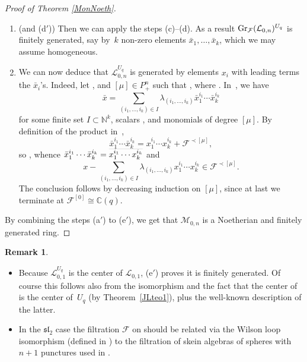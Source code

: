 \documentclass[10pt,a4paper]{amsart}
\numberwithin{equation}{section}
\theoremstyle{definition}
\newtheorem{Remark}[teo]{Remark}
\newcommand{\mc}{\mathbb{C}}
\newcommand{\mn}{\mathbb{N}}
\newcommand{\Ll}{{\mathcal L}}
\newcommand{\Mm}{{\mathcal M}}
\begin{document}
\begin{proof}[Proof of Theorem \ref{MonNoeth}]
\begin{enumerate}
\item[(c$'$)] (and (d$'$)) Then we can apply the steps (c)--(d). As a result ${\rm Gr}_{{\mathcal F}}({\mathcal L}_{0,n})^{U_q}$ is finitely generated, say by~$k$ non-zero elements $\bar{x}_1,\dots,\bar{x}_k$, which we may assume homogeneous.
\item[(e$'$)] We can now deduce that $\Ll_{0,n}^{U_q}$ is generated by elements $x_i$ with leading terms the
$\bar{x}_i$'s. Indeed, let \smash{$x\in \Ll_{0,n}^{U_q}$}, and $[\mu]\in P_+^n$ such that , where . In~, we have
\[
 \bar{x}\! =\! \sum_{(i_1,\dots ,i_k)\in I} \lambda_{(i_1,\dots ,i_k)} \bar{x}_1^{i_1}\cdots\bar{x}_k^{i_k}
 \]
 for some finite set ${I\!\subset\! \mn^k}$, scalars \smash{$\lambda_{(i_1,\dots ,i_k)}\in \mc(q)$}, and monomials  of degree $[\mu]$. By definition of the product in~, \[
 \bar{x}_1^{i_1}\cdots\bar{x}_k^{i_k} = x_1^{i_1}\cdots x_k^{i_k} + {\mathcal F}^{\prec[\mu]},
 \]
 so , whence $\smash{\bar{x}_1^{i_1}\cdots\bar{x}_k^{i_k}} = \smash{\overline{x_1^{i_1}\cdots x_k^{i_k}}}$ and
 \[
 x- \sum_{(i_1,\dots ,i_k)\in I} \lambda_{(i_1,\dots ,i_k)} x_1^{i_1}\cdots x_k^{i_k} \in {\mathcal F}^{\prec [\mu]}.
 \]
 The conclusion follows by decreasing induction on $[\mu]$, since at last we terminate at ${{\mathcal F}^{[0]}\cong \mc(q)}$.
\end{enumerate}

By combining the steps (a$'$) to (e$'$), we get that $\Mm_{0,n}$ is a Noetherian and finitely generated ring.
\end{proof}

\begin{Remark} \quad
\begin{itemize}\itemsep=0pt
\item[(1)] Because ${\mathcal L}_{0,1}^{U_q}$ is the center of ${\mathcal L}_{0,1}$, (e$'$) proves it is finitely generated. Of course this follows also from the isomorphism \smash{$\Ll_{0,1}\cong U_q^{\rm lf}$} and the fact that the center of  is the center of~$U_q$ (by Theorem~\ref{JLteo1}), plus the well-known description of the latter.
\item[(2)] In the ${\mathfrak{sl}_2}$ case the filtration $\mathcal{F}$ on  should be related via the Wilson loop isomorphism (defined in \cite[Section 8.2]{BR}) to the filtration of skein algebras of spheres with $n+1$ punctures used in \cite{PS}.
 \end{itemize}
\end{Remark}
\end{document}
